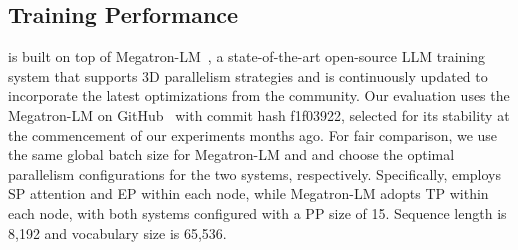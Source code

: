 \subsection{Training Performance}
\label{sec:evaluation:performance}

\sysname is built on top of Megatron-LM~\cite{shoeybi2019megatron}, a state-of-the-art open-source LLM training system that supports 3D parallelism strategies and is continuously updated to incorporate the latest optimizations from the community. Our evaluation uses the Megatron-LM on GitHub~\cite{megatron-lm} with commit hash f1f03922, selected for its stability at the commencement of our experiments months ago. For fair comparison, we use the same global batch size for Megatron-LM and \sysname and choose the optimal parallelism configurations for the two systems, respectively. Specifically, \sysname employs SP attention and EP within each node, while Megatron-LM adopts TP within each node, with both systems configured with a PP size of 15.  Sequence length is 8,192 and vocabulary size is 65,536. 

